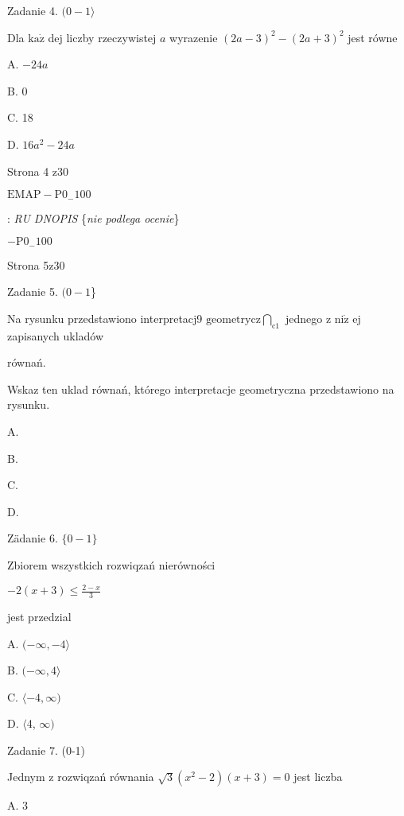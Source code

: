 \documentclass[a4paper,12pt]{article}
\begin{document}
Zadanie 4. $(0-1\rangle$

Dla $\mathrm{k}\mathrm{a}\dot{\mathrm{z}}$ dej liczby rzeczywistej $a$ wyrazenie $(2a-3)^{2}-(2a+3)^{2}$ jest równe

A. $-24a$

B. 0

C. 18

D. $16a^{2}-24a$

Strona 4 z30

$\mathrm{E}\mathrm{M}\mathrm{A}\mathrm{P}-\mathrm{P}0_{-}100$















: {\it RU DNOPIS} \{{\it nie podlega ocenie}\}

$-\mathrm{P}0_{-}100$

Strona 5z30





Zadanie 5. $(0-1$\}

Na rysunku przedstawiono interpretacj9 $\displaystyle \mathrm{g}\mathrm{e}\mathrm{o}\mathrm{m}\mathrm{e}\mathrm{t}\mathrm{r}\mathrm{y}\mathrm{c}\mathrm{z}\bigcap_{\mathrm{c}1}$ jednego z $\mathrm{n}\mathrm{i}\dot{\mathrm{z}}$ ej zapisanych ukladów

równań.

Wskaz ten uklad równań, którego interpretacje geometryczna przedstawiono na rysunku.

A. 

B. 

C. 

D. 

Zädanie 6. $\{0-1\}$

Zbiorem wszystkich rozwiqzań nierówności

$-2(x+3)\displaystyle \leq\frac{2-x}{3}$

jest przedzial

A. $(-\infty, -4\rangle$

B. $(-\infty,  4\rangle$

C. $\langle-4, \infty)$

D. $\langle$4, $\infty)$

Zadanie 7. (0-1)

Jednym z rozwiqzań równania $\sqrt{3}(x^{2}-2)(x+3)=0$ jest liczba

A. 3
\end{document}
